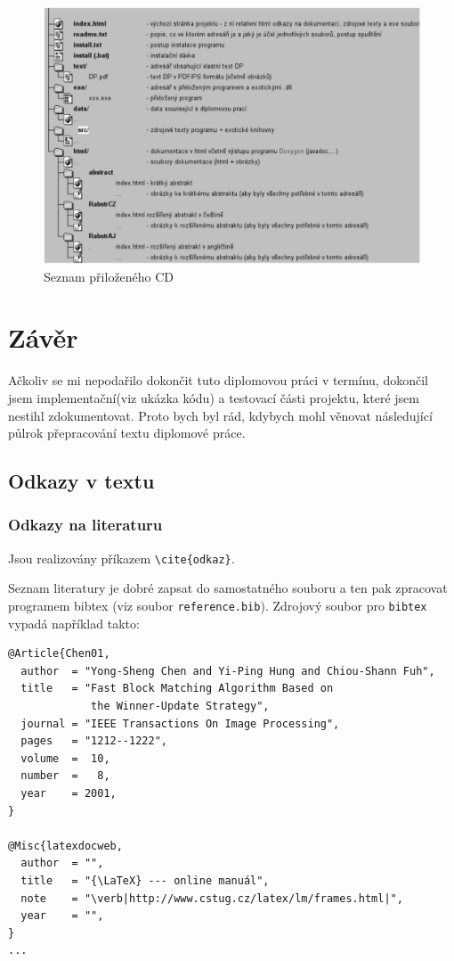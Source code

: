 \documentclass[11pt,twoside,a4paper]{book}
\begin{document}
\begin{figure}[h]
\begin{center}
\includegraphics[width=14cm]{figures/seznamcd}
\caption{Seznam přiloženého CD}
\label{fig:seznamcd}
\end{center}
\end{figure}

\chapter{Závěr}
Ačkoliv se mi nepodařilo dokončit tuto diplomovou práci v termínu, dokončil jsem
implementační(viz ukázka kódu) a testovací části projektu, které jsem nestihl
zdokumentovat. Proto bych byl rád, kdybych mohl věnovat následující půlrok
přepracování textu diplomové práce.


\section{Odkazy v textu}
\subsection{Odkazy na literaturu}
Jsou realizovány příkazem \verb|\cite{odkaz}|. 

Seznam literatury je dobré zapsat do samostatného souboru a ten pak zpracovat programem bibtex (viz soubor \verb|reference.bib|). Zdrojový soubor pro \verb|bibtex| vypadá například takto:
\begin{verbatim}
@Article{Chen01,
  author  = "Yong-Sheng Chen and Yi-Ping Hung and Chiou-Shann Fuh",
  title   = "Fast Block Matching Algorithm Based on 
             the Winner-Update Strategy",
  journal = "IEEE Transactions On Image Processing",
  pages   = "1212--1222",
  volume  =  10,
  number  =   8,
  year    = 2001,
}

@Misc{latexdocweb,
  author  = "",
  title   = "{\LaTeX} --- online manuál",
  note    = "\verb|http://www.cstug.cz/latex/lm/frames.html|",
  year    = "",
}
...
\end{verbatim}
\end{document}
